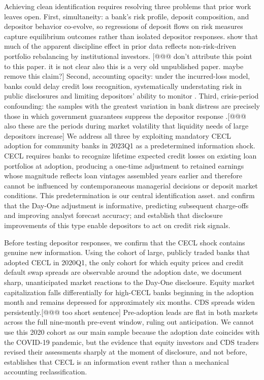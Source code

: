Achieving clean identification requires resolving three problems that prior work leaves
open.  First, simultaneity: a bank's risk profile, deposit composition, and
depositor behavior co-evolve, so regressions of deposit flows on risk measures
capture equilibrium outcomes rather than isolated depositor responses.
\citet{covitz2004market} show that much of the apparent discipline effect in
prior data reflects non-risk-driven portfolio rebalancing by institutional
investors. [@@@ don't attribute this point to this paper. it is not clear also this is a very old unpublished paper. maybe remove this claim?]  Second, accounting opacity: under the incurred-loss model, banks
could delay credit loss recognition, systematically understating risk in public
disclosures and limiting depositors' ability to monitor
\citep{bushman2012accounting, bushman2015delayed}.  Third, crisis-period
confounding: the samples with the greatest variation in bank distress are
precisely those in which government guarantees suppress the depositor response
\citep{bennett2015market}.[@@@ also these are the periods during market volatility that liquidity needs of large depositors increase]  We address all three by exploiting mandatory CECL
adoption for community banks in 2023Q1 as a predetermined information shock.
CECL requires banks to recognize lifetime expected credit losses on existing
loan portfolios at adoption, producing a one-time adjustment to retained
earnings whose magnitude reflects loan vintages assembled years earlier and
therefore cannot be influenced by contemporaneous managerial decisions or
deposit market conditions.  This predetermination is our central identification
asset.  \citet{kim2026current} and \citet{gee2022decision} confirm that the
Day-One adjustment is informative, predicting subsequent charge-offs
and improving analyst forecast accuracy; \citet{nier2006market} and
\citet{chen2022bank} establish that disclosure improvements of this
type enable depositors to act on credit risk signals.  

Before testing depositor responses, we confirm that the CECL shock contains
genuine new information.  Using the cohort of large, publicly traded banks that
adopted CECL in 2020Q1, the only cohort for which equity prices and credit
default swap spreads are observable around the adoption date, we document sharp,
unanticipated market reactions to the Day-One disclosure.  Equity market
capitalization falls differentially for high-CECL banks beginning in the adoption
month and remains depressed for approximately six months.  CDS
spreads widen persistently.[@@@ too short sentence]  Pre-adoption leads are flat in both markets across
the full nine-month pre-event window, ruling out anticipation.  We cannot use
this 2020 cohort as our main sample because the adoption date coincides with the
COVID-19 pandemic, but the evidence that equity investors and CDS traders revised
their assessments sharply at the moment of disclosure, and not before, establishes
that CECL is an information event rather than a mechanical accounting
reclassification.

